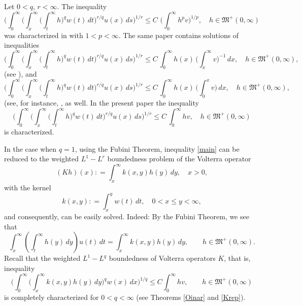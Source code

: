 \documentclass[12pt]{amsart}
\theoremstyle{plain}
\theoremstyle{definition}
\numberwithin{thm}{section}
\numberwithin{equation}{section}
\begin{document}
Let $0 < q ,\, r < \infty$. The inequality
\begin{equation}\label{IHI.0.1}
\bigg( \int_0^{\infty} \bigg( \int_x^{\infty} \bigg( \int_t^{\infty} h \bigg)^q w(t)\,dt
\bigg)^{r / q} u(x)\,ds \bigg)^{1/r}\leq C \,\, \bigg( \int_0^{\infty} h^p v \bigg)^{1 / p}, \quad h \in {\mathfrak M}^+(0,\infty)
\end{equation}
was characterized in \cite[Theorem 6.5]{GogMusIHI} with $1 < p < \infty$. The same paper contains solutions of inequalities
\begin{equation}\label{IHI.0.2}
\bigg( \int_0^{\infty} \bigg( \int_x^{\infty} \bigg( \int_t^{\infty} h \bigg)^q w(t)\,dt
\bigg)^{r / q} u(x)\,ds \bigg)^{1/r}\leq C \, \int_0^{\infty} h(x)  \, \bigg( \int_x^{\infty} v\bigg)^{-1}\,dx, \quad h \in {\mathfrak M}^+(0,\infty),
\end{equation}
(see \cite[Theorem 6.6]{GogMusIHI}), and
\begin{equation}\label{IHI.0.3}
\bigg( \int_0^{\infty} \bigg( \int_x^{\infty} \bigg( \int_t^{\infty} h \bigg)^q w(t)\,dt
\bigg)^{r / q} u(x)\,ds \bigg)^{1/r}\leq C \, \int_0^{\infty} h(x)  \, \bigg( \int_0^x v\bigg)\,dx, \quad h \in {\mathfrak M}^+(0,\infty),
\end{equation}
(see, for instance, \cite[Corollary 3.24 and Theorem 5.2]{GogMusIHI}, as well. In the present paper the inequality
\begin{equation}\label{main}
\bigg( \int_0^{\infty} \bigg( \int_x^{\infty} \bigg( \int_t^{\infty} h \bigg)^q w(t)\,dt
\bigg)^{r / q} u(x)\,ds \bigg)^{1/r}\leq C \,\int_0^{\infty} h v, \quad h \in {\mathfrak M}^+(0,\infty)
\end{equation}
is characterized.

In the case when $q=1$, using the Fubini Theorem, inequality \eqref{main} can be reduced to the weighted $L^1 - L^r$ boundedness problem of the  Volterra operator
$$
(Kh)(x) : = \int_x^{\infty} k(x,y) h(y)\,dy, \quad x > 0,
$$
with the kernel
$$
k(x,y) : = \int_x^y w(t)\,dt, \quad 0 < x \le y < \infty,
$$
and consequently, can be easily solved. Indeed: By  the Fubini Theorem, we see that
$$
\int_x^{\infty} \left( \int_t^{\infty}
h(y)\,dy\right)u(t)\,dt = \int_x^{\infty} k(x,y) h(y)\,dy, \qquad h\in {\mathfrak M}^+(0,\infty).
$$
Recall that the weighted $L^1 - L^q$ boundedness of Volterra operators $K$, that is, inequality
\begin{equation}\label{volter}
\bigg( \int_0^{\infty} \bigg( \int_x^{\infty} k(x,y) h(y)\,dy \bigg)^q w(x)\,dx\bigg)^{1/q} \le C \int_0^{\infty} hv, \qquad h \in {{\mathfrak M}}^+ (0,\infty)
\end{equation}
is completely characterized for $0 <  q < \infty$ (see Theorems \ref{Oinar} and \ref{Krep}).
\end{document}
